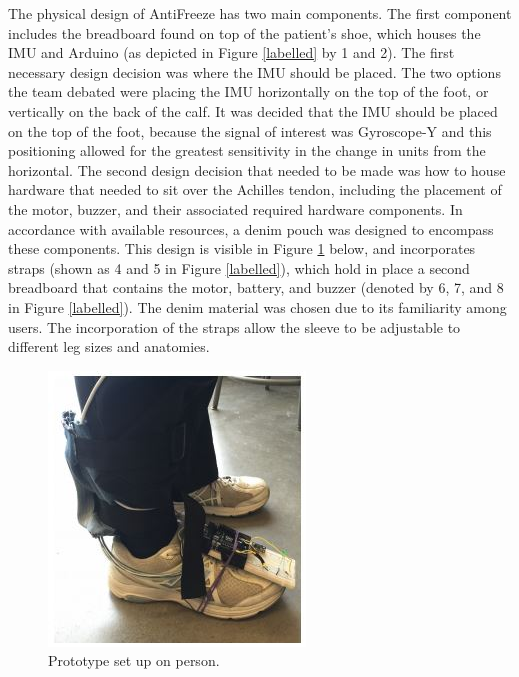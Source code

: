 \documentclass[titlepage]{article}
\begin{document}
\begin{doublespacing}
The physical design of AntiFreeze has two main components. The first component includes the breadboard found on top of the patient's shoe, which houses the IMU and Arduino (as depicted in Figure \ref{labelled} by 1 and 2). The first necessary design decision was where the IMU should be placed. The two options the team debated were placing the IMU horizontally on the top of the foot, or vertically on the back of the calf. It was decided that the IMU should be placed on the top of the foot, because the signal of interest was Gyroscope-Y and this positioning allowed for the greatest sensitivity in the change in units from the horizontal. The second design decision that needed to be made was how to house hardware that needed to sit over the Achilles tendon, including the placement of the motor, buzzer, and their associated required hardware components. In accordance with available resources, a denim pouch was designed to encompass these components. This design is visible in Figure \ref{on-foot} below, and incorporates straps (shown as 4 and 5 in Figure \ref{labelled}), which hold in place a second breadboard that contains the motor, battery, and buzzer (denoted by 6, 7, and 8 in Figure \ref{labelled}). The denim material was chosen due to its familiarity among users. The incorporation of the straps allow the sleeve to be adjustable to different leg sizes and anatomies.

\begin{figure}
	\includegraphics[width=\linewidth]{on-foot}
	\caption{Prototype set up on person.}
	\label{on-foot}
\end{figure}


\end{doublespacing}
\end{document}
